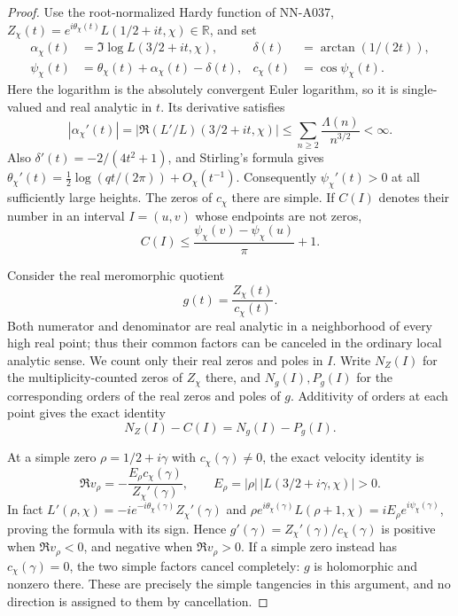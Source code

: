 \begin{proof}
Use the root-normalized Hardy function of NN-A037,
$Z_\chi(t)=e^{i\theta_\chi(t)}L(1/2+it,\chi)\in\mathbb R$,
and set
\begin{align*}
 \alpha_\chi(t)&=\Im\log L(3/2+it,\chi),
   &\delta(t)&=\arctan(1/(2t)),\\
 \psi_\chi(t)&=\theta_\chi(t)+\alpha_\chi(t)-\delta(t),
   &c_\chi(t)&=\cos\psi_\chi(t).
\end{align*}
Here the logarithm is the absolutely convergent Euler logarithm,
so it is single-valued and real analytic in $t$. Its derivative
satisfies
\[
 |\alpha_\chi'(t)|
 =|\Re (L'/L)(3/2+it,\chi)|
 \le\sum_{n\ge2}\frac{\Lambda(n)}{n^{3/2}}<\infty.
\]
Also $\delta'(t)=-2/(4t^2+1)$, and Stirling's formula gives
$\theta_\chi'(t)=\frac12\log(qt/(2\pi))+O_\chi(t^{-1})$.
Consequently $\psi_\chi'(t)>0$ at all sufficiently large heights.
The zeros of $c_\chi$ there are simple. If $C(I)$ denotes their
number in an interval $I=(u,v)$ whose endpoints are not zeros,
\begin{equation}\label{eq:A042-cos-count}
 C(I)\le\frac{\psi_\chi(v)-\psi_\chi(u)}\pi+1.
\end{equation}

Consider the real meromorphic quotient
\[
                         g(t)=\frac{Z_\chi(t)}{c_\chi(t)}.
\]
Both numerator and denominator are real analytic in a neighborhood
of every high real point; thus their common factors can be
canceled in the ordinary local analytic sense. We count only
their real zeros and poles in $I$. Write $N_Z(I)$ for the
multiplicity-counted zeros of $Z_\chi$ there, and $N_g(I),P_g(I)$
for the corresponding orders of the real zeros and poles of $g$.
Additivity of orders at each point gives the exact identity
\begin{equation}\label{eq:A042-divisor-difference}
                  N_Z(I)-C(I)=N_g(I)-P_g(I).
\end{equation}

At a simple zero $\rho=1/2+i\gamma$ with $c_\chi(\gamma)\ne0$,
the exact velocity identity is
\begin{equation}\label{eq:A042-simple-crossing}
 \Re v_\rho=-\frac{E_\rho c_\chi(\gamma)}{Z_\chi'(\gamma)},
 \qquad E_\rho=|\rho|\,|L(3/2+i\gamma,\chi)|>0.
\end{equation}
In fact $L'(\rho,\chi)=-i e^{-i\theta_\chi(\gamma)}
Z_\chi'(\gamma)$ and
$\rho e^{i\theta_\chi(\gamma)}L(\rho+1,\chi)
=i E_\rho e^{i\psi_\chi(\gamma)}$, proving the formula with
its sign. Hence $g'(\gamma)=Z_\chi'(\gamma)/c_\chi(\gamma)$
is positive when $\Re v_\rho<0$, and negative when
$\Re v_\rho>0$. If a simple zero instead has
$c_\chi(\gamma)=0$, the two simple factors cancel completely:
$g$ is holomorphic and nonzero there. These are precisely the
simple tangencies in this argument, and no direction is assigned
to them by cancellation.


\end{proof}
